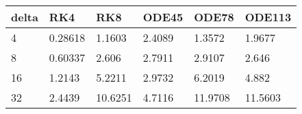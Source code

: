 \begin{tabular}{llllll}
delta & RK4 & RK8 & ODE45 & ODE78 & ODE113 \\ 
\hline 
4 & 0.28618 & 1.1603 & 2.4089 & 1.3572 & 1.9677 \\ 
8 & 0.60337 & 2.606 & 2.7911 & 2.9107 & 2.646 \\ 
16 & 1.2143 & 5.2211 & 2.9732 & 6.2019 & 4.882 \\ 
32 & 2.4439 & 10.6251 & 4.7116 & 11.9708 & 11.5603 \\ 
\hline 
\end{tabular}